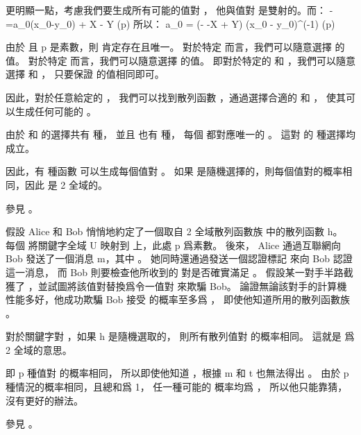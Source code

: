 更明顯一點，考慮我們要生成所有可能的值對 \m{\alpha,\beta}，
他與值對 \m{\alpha,\alpha-\beta} 是雙射的。而：
\startformula
\alpha-\beta=a_0(x_0-y_0) + X - Y (\mod p)
\stopformula
所以：
\startformula
a_0 = (\alpha - \beta -X + Y) (x_0 - y_0)^{(-1)} (\mod p)
\stopformula

由於  且 p 是素數，則  肯定存在且唯一。
對於特定  而言，我們可以隨意選擇 \m{\alpha-\beta} 的值。
對於特定  而言，我們可以隨意選擇 \m{\alpha} 的值。
即對於特定的  和 ，我們可以隨意選擇 \m{\alpha} 和 \m{\beta}，
只要保證  的值相同即可。

因此，對於任意給定的 ，
我們可以找到散列函數 ，通過選擇合適的  和 ，
使其可以生成任何可能的 \m{\langle\alpha,\beta\rangle}。

由於  和  的選擇共有  種，
並且 \m{\langle\alpha,\beta\rangle} 也有  種，
每個 \m{\langle\alpha,\beta\rangle} 都對應唯一的 。
這對  的  種選擇均成立。

因此，有  種函數  可以生成每個值對 \m{\langle\alpha,\beta\rangle}。
如果  是隨機選擇的，則每個值對的概率相同，因此  是 2 全域的。

參見 。
\stopANSWER

\startitem%
假設 Alice 和 Bob 悄悄地約定了一個取自 2 全域散列函數族  中的散列函數 h。
每個  將關鍵字全域 U 映射到  上，此處 p 爲素數。
後來， Alice 通過互聯網向 Bob 發送了一個消息 m，其中 。
她同時還通過發送一個認證標記  來向 Bob 認證這一消息，
而 Bob 則要檢查他所收到的  對是否確實滿足 。
假設某一對手半路截獲了 ，並試圖將該值對替換爲令一值對  來欺騙 Bob。
論證無論該對手的計算機性能多好，他成功欺騙 Bob 接受  的概率至多爲 ，
即使他知道所用的散列函數族 。
\stopitem

\startANSWER
對於關鍵字對 ，如果 h 是隨機選取的，
則所有散列值對  的概率相同。
這就是  爲 2 全域的意思。

即 p 種值對  的概率相同，
所以即使他知道 ，根據 m 和 t 也無法得出 。
由於 p 種情況的概率相同，且總和爲 1，
任一種可能的  概率均爲 ，
所以他只能靠猜，沒有更好的辦法。

參見 。
\stopANSWER
\stopigBase
\stopPROBLEM

\stopsubject%
